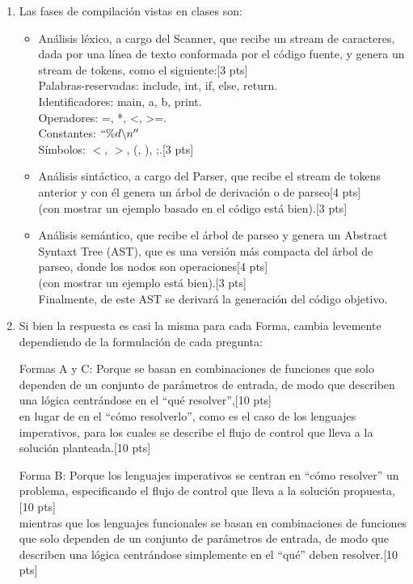 \documentclass[letter,12pt,oneside]{book}
\theoremstyle{definition}
\begin{document}
\begin{enumerate}
    \item Las fases de compilación vistas en clases son:
    \begin{itemize}
        \item Análisis léxico, a cargo del Scanner, que recibe un stream de caracteres, dada por una línea de texto conformada por el código fuente, y genera un stream de tokens, como el siguiente:\tabto{77ex}[3 pts]\\
        Palabras-reservadas: include, int, if, else, return.\\
        Identificadores: main, a, b, print.\\
        Operadores: =, *, <, >=.\\
        Constantes: $``\% d\backslash n''$\\
        Símbolos: $<$, $>$, (, ), ;.\tabto{77ex}[3 pts]
        \item Análisis sintáctico, a cargo del Parser, que recibe el stream de tokens anterior y con él genera un árbol de derivación o de parseo\tabto{77ex}[4 pts]\\(con mostrar un ejemplo basado en el código está bien).\tabto{77ex}[3 pts]
        \item Análisis semántico, que recibe el árbol de parseo y genera un Abstract Syntaxt Tree (AST), que es una versión más compacta del árbol de parseo, donde los nodos son operaciones\tabto{77ex}[4 pts]\\(con mostrar un ejemplo está bien).\tabto{77ex}[3 pts]\\
        Finalmente, de este AST se derivará la generación del código objetivo.
    \end{itemize}
    \item Si bien la respuesta es casi la misma para cada Forma, cambia levemente dependiendo de la formulación de cada pregunta:
    
    Formas A y C: 
    Porque se basan en combinaciones de funciones que solo dependen de un conjunto de parámetros de entrada, de modo que describen una lógica centrándose en el ``qué resolver'',\tabto{81ex}[10 pts]\\
    en lugar de en el ``cómo resolverlo'', como es el caso de los lenguajes imperativos, para los cuales se describe el flujo de control que lleva a la solución planteada.\tabto{81ex}[10 pts]
    
    Forma B:
    Porque los lenguajes imperativos se centran en ``cómo resolver'' un problema, especificando el flujo de control que lleva a la solución propuesta,\tabto{81ex}[10 pts]\\
    mientras que los lenguajes funcionales se basan en combinaciones de funciones que solo dependen de un conjunto de parámetros de entrada, de modo que describen una lógica centrándose simplemente en el ``qué'' deben resolver.\tabto{81ex}[10 pts]
    

\end{enumerate}
\end{document}
